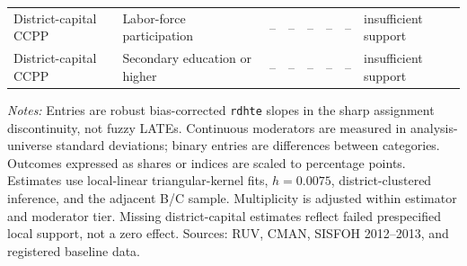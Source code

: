 \begin{table}[!htbp]
{\begin{tabular}{llrrrrrl}
District-capital CCPP & Labor-force participation & -- & -- & -- & -- & -- & insufficient support \\
District-capital CCPP & Secondary education or higher & -- & -- & -- & -- & -- & insufficient support \\
\bottomrule
\end{tabular}}
\parbox{0.97\linewidth}{\footnotesize \textit{Notes:} Entries are robust bias-corrected \texttt{rdhte} slopes in the sharp assignment discontinuity, not fuzzy LATEs. Continuous moderators are measured in analysis-universe standard deviations; binary entries are differences between categories. Outcomes expressed as shares or indices are scaled to percentage points. Estimates use local-linear triangular-kernel fits, \(h=0.0075\), district-clustered inference, and the adjacent B/C sample. Multiplicity is adjusted within estimator and moderator tier. Missing district-capital estimates reflect failed prespecified local support, not a zero effect. Sources: RUV, CMAN, SISFOH 2012--2013, and registered baseline data.}
\end{table}
